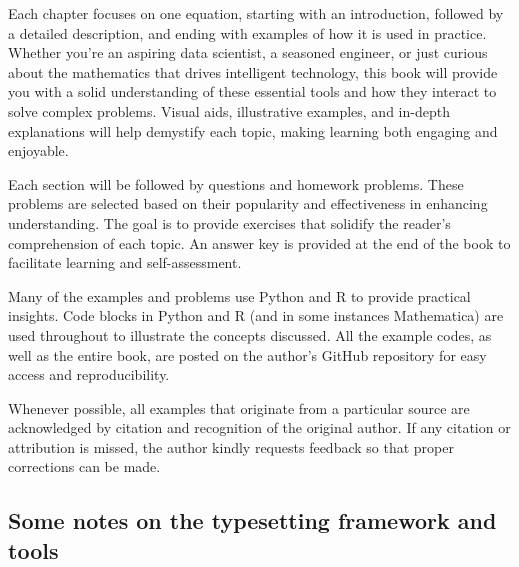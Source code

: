 \documentclass[
  12 pt,
  a4paper,
]{book}
\numberwithin{equation}{section}
\theoremstyle{plain}      %
\theoremstyle{definition} %
\theoremstyle{remark}     %
\theoremstyle{note}         %
\begin{document}
Each chapter focuses on one equation, starting with an introduction,
followed by a detailed description, and ending with examples of how it
is used in practice. Whether you're an aspiring data scientist, a
seasoned engineer, or just curious about the mathematics that drives
intelligent technology, this book will provide you with a solid
understanding of these essential tools and how they interact to solve
complex problems. Visual aids, illustrative examples, and in-depth
explanations will help demystify each topic, making learning both
engaging and enjoyable.

Each section will be followed by questions and homework problems. These
problems are selected based on their popularity and effectiveness in
enhancing understanding. The goal is to provide exercises that solidify
the reader's comprehension of each topic. An answer key is provided at
the end of the book to facilitate learning and self-assessment.

Many of the examples and problems use Python and R to provide practical
insights. Code blocks in Python and R (and in some instances
Mathematica) are used throughout to illustrate the concepts discussed.
All the example codes, as well as the entire book, are posted on the
author's GitHub repository for easy access and reproducibility.

Whenever possible, all examples that originate from a particular source
are acknowledged by citation and recognition of the original author. If
any citation or attribution is missed, the author kindly requests
feedback so that proper corrections can be made.

\hypertarget{some-notes-on-the-typesetting-framework-and-tools}{%
\subsection*{Some notes on the typesetting framework and
tools}\label{some-notes-on-the-typesetting-framework-and-tools}}
\end{document}
